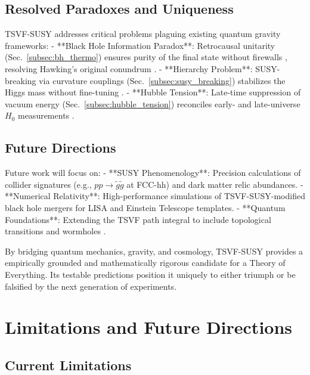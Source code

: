 \documentclass[twocolumn,superscriptaddress,floatfix]{revtex4-2}
\begin{document}
\subsection{Resolved Paradoxes and Uniqueness}  
TSVF-SUSY addresses critical problems plaguing existing quantum gravity frameworks:  
- **Black Hole Information Paradox**: Retrocausal unitarity (Sec.~\ref{subsec:bh_thermo}) ensures purity of the final state without firewalls \cite{Almheiri2013}, resolving Hawking's original conundrum \cite{Hawking1976}.  
- **Hierarchy Problem**: SUSY-breaking via curvature couplings (Sec.~\ref{subsec:susy_breaking}) stabilizes the Higgs mass without fine-tuning \cite{Giudice2008}.  
- **Hubble Tension**: Late-time suppression of vacuum energy (Sec.~\ref{subsec:hubble_tension}) reconciles early- and late-universe $H_0$ measurements \cite{Riess2021}.  

\subsection{Future Directions}  
Future work will focus on:  
- **SUSY Phenomenology**: Precision calculations of collider signatures (e.g., $pp \to \tilde{g}\tilde{g}$ at FCC-hh) and dark matter relic abundances.  
- **Numerical Relativity**: High-performance simulations of TSVF-SUSY-modified black hole mergers for LISA and Einstein Telescope templates.  
- **Quantum Foundations**: Extending the TSVF path integral to include topological transitions and wormholes \cite{Maldacena2020}.  

By bridging quantum mechanics, gravity, and cosmology, TSVF-SUSY provides a empirically grounded and mathematically rigorous candidate for a Theory of Everything. Its testable predictions position it uniquely to either triumph or be falsified by the next generation of experiments.  

\section{Limitations and Future Directions}  
\label{sec:limitations}  

\subsection{Current Limitations}  
\label{subsec:limitations}  
\end{document}
